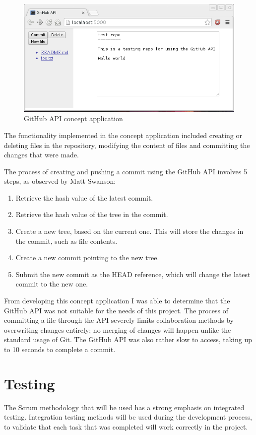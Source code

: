 \documentclass[a4paper, 12pt]{article}
\begin{document}
\begin{figure}[h]
	\centering
	\includegraphics[scale=0.6]{proto1}
	\caption{GitHub API concept application}
	\label{fig:proto1}
\end{figure}

The functionality implemented in the concept application included creating or deleting files in the repository, modifying the content of files and committing the changes that were made.

The process of creating and pushing a commit using the GitHub API involves 5 steps, as observed by Matt Swanson\cite{githubapicommit}:
\begin{enumerate}
	\item Retrieve the hash value of the latest commit.
	\item Retrieve the hash value of the tree in the commit.
	\item Create a new tree, based on the current one. This will store the changes in the commit, such as file contents.
	\item Create a new commit pointing to the new tree.
	\item Submit the new commit as the HEAD reference, which will change the latest commit to the new one.
\end{enumerate}

From developing this concept application I was able to determine that the GitHub API was not suitable for the needs of this project. The process of committing a file through the API severely limits collaboration methods by overwriting changes entirely; no merging of changes will happen unlike the standard usage of Git. The GitHub API was also rather slow to access, taking up to 10 seconds to complete a commit.

\section{Testing}
The Scrum methodology that will be used has a strong emphasis on integrated testing. Integration testing methods will be used during the development process, to validate that each task that was completed will work correctly in the project.
\end{document}
